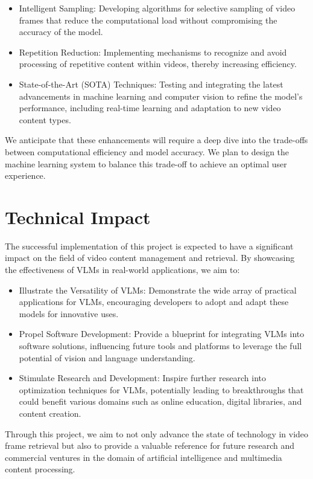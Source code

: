 \documentclass[11pt]{article}
\begin{document}
\begin{itemize}
    \item Intelligent Sampling: Developing algorithms for selective sampling of video frames that reduce the computational load without compromising the accuracy of the model.
    \item Repetition Reduction: Implementing mechanisms to recognize and avoid processing of repetitive content within videos, thereby increasing efficiency.
    \item State-of-the-Art (SOTA) Techniques: Testing and integrating the latest advancements in machine learning and computer vision to refine the model's performance, including real-time learning and adaptation to new video content types.
\end{itemize}

We anticipate that these enhancements will require a deep dive into the trade-offs between computational efficiency and model accuracy. We plan to design the machine learning system to balance this trade-off to achieve an optimal user experience.

\section{Technical Impact}
The successful implementation of this project is expected to have a significant impact on the field of video content management and retrieval. By showcasing the effectiveness of VLMs in real-world applications, we aim to:

\begin{itemize}
    \item Illustrate the Versatility of VLMs: Demonstrate the wide array of practical applications for VLMs, encouraging developers to adopt and adapt these models for innovative uses.
    \item Propel Software Development: Provide a blueprint for integrating VLMs into software solutions, influencing future tools and platforms to leverage the full potential of vision and language understanding.
    \item Stimulate Research and Development: Inspire further research into optimization techniques for VLMs, potentially leading to breakthroughs that could benefit various domains such as online education, digital libraries, and content creation.
\end{itemize}

Through this project, we aim to not only advance the state of technology in video frame retrieval but also to provide a valuable reference for future research and commercial ventures in the domain of artificial intelligence and multimedia content processing.
\end{document}
